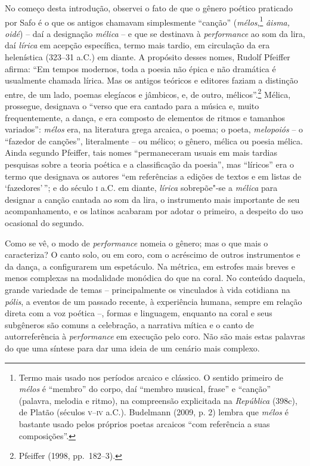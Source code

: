 No começo desta introdução, observei o fato de que o gênero poético praticado
por Safo é o que os antigos chamavam simplesmente “canção”
(\textit{mélos},\footnote{ Termo mais usado nos períodos arcaico e clássico.
O sentido primeiro de \textit{mélos} é “membro” do corpo, daí “membro
musical, frase” e “canção” (palavra, melodia e ritmo), na compreensão
explicitada na \textit{República} (398c), de Platão (séculos \textsc{v}--\textsc{iv} a.C.).
Budelmann (2009, p. 2) lembra que \textit{mélos} é bastante usado pelos próprios poetas arcaicos ``com referência a suas composições”.} \textit{âisma, oidé}) -- daí a
designação \textit{mélica} -- e que se destinava à \textit{performance} ao som
da lira, daí \textit{lírica} em acepção específica, termo mais tardio, em
circulação da era helenística (323--31 a.C.) em diante. A propósito
desses nomes, Rudolf Pfeiffer afirma: “Em tempos
modernos, toda a poesia não épica e não dramática é usualmente chamada lírica.
Mas os antigos teóricos e editores faziam a distinção entre, de um lado, poemas
elegíacos e jâmbicos, e, de outro, mélicos”.\footnote{ Pfeiffer (1998, pp.~182--3).} Mélica, prossegue,
designava o “verso que era cantado para a música e, muito frequentemente, a
dança, e era composto de elementos de ritmos e tamanhos variados”:
\textit{mélos} era, na literatura grega arcaica, o poema; o poeta,
\textit{melopoiós} -- o “fazedor de canções”, literalmente -- ou mélico; o
gênero, mélica ou poesia mélica. Ainda segundo Pfeiffer, tais nomes
“permaneceram usuais em mais tardias pesquisas sobre a teoria poética e a
classificação da poesia”, mas “líricos” era o termo que designava os autores
“em referências a edições de textos e em listas de ‘fazedores’\,”; e do século \textsc{i}
a.C. em diante, \textit{lírica} sobrepõe"-se a \textit{mélica} para designar a canção
cantada ao som da lira, o instrumento mais importante de seu acompanhamento, e
os latinos acabaram por adotar o primeiro, a despeito do uso ocasional do
segundo.

Como se vê, o modo de \textit{performance} nomeia o gênero;
mas o que mais o caracteriza? O canto solo,
ou em coro, com o acréscimo de
outros instrumentos e da dança, a configurarem um espetáculo. Na métrica,
em estrofes mais breves e menos
complexas na modalidade monódica do que na coral. No conteúdo daquela, grande variedade de temas -- principalmente os vinculados à
vida cotidiana na \textit{pólis}, a eventos de um passado recente, à
experiência humana, sempre em relação direta com a voz poética --, formas e
linguagem, enquanto na coral e seus subgêneros são comuns a celebração, a
narrativa mítica e o canto de autorreferência à \textit{performance} em
execução pelo coro. Não são mais estas palavras do que uma síntese para dar uma ideia de um cenário mais complexo. 

